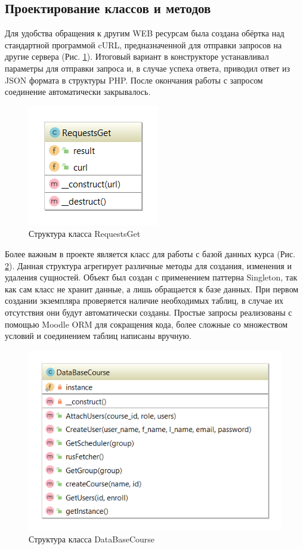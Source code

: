 \documentclass[a4paper,14pt]{article}
\begin{document}
\subsection{Проектирование классов и методов}

Для удобства обращения к другим WEB ресурсам была создана обёртка над стандартной программой cURL, предназначенной для отправки запросов на другие сервера (Рис. \ref{img:request_class}).
Итоговый вариант в конструкторе устанавливал параметры для отправки запроса и, в случае успеха ответа, приводил ответ из JSON формата в структуры PHP.
После окончания работы с запросом соединение автоматически закрывалось.

\begin{figure}[H]
	\centering		
	\includegraphics{image/RequestsGet}
	\caption{Структура класса RequestsGet}\label{img:request_class}
\end{figure}

Более важным в проекте является класс для работы с базой данных курса (Рис. \ref{img:db_class}). 
Данная структура агрегирует различные методы для создания, изменения и удаления сущностей.
Объект был создан с применением паттерна Singleton, так как сам класс не хранит данные, а лишь обращается к базе данных.
При первом создании экземпляра проверяется наличие необходимых таблиц, в случае их отсутствия они будут автоматически созданы.
Простые запросы реализованы с помощью Moodle ORM для сокращения кода, более сложные со множеством условий и соединением таблиц написаны вручную.


\begin{figure}[H]
	\centering		
	\includegraphics[width=0.7\linewidth]{image/DataBaseClass}
	\caption{Структура класса DataBaseCourse}\label{img:db_class}
\end{figure}
\end{document}
